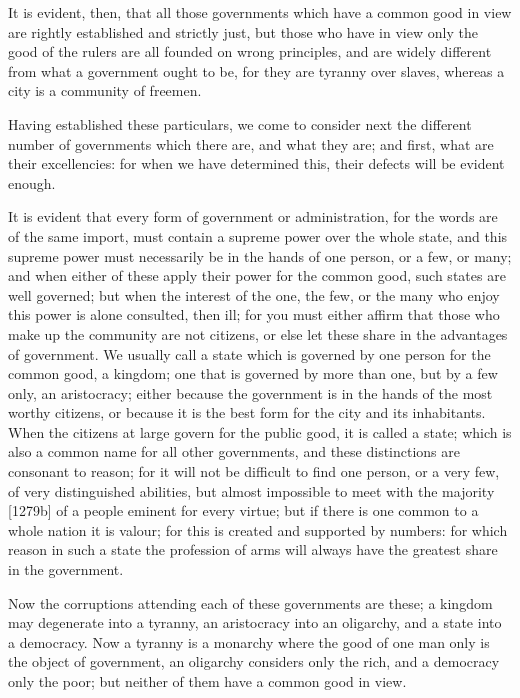 It is evident, then, that all those governments which have a common good
in view are rightly established and strictly just, but those who have in
view only the good of the rulers are all founded on wrong principles, and
are widely different from what a government ought to be, for they are
tyranny over slaves, whereas a city is a community of freemen.


Having established these particulars, we come to consider next the
different number of governments which there are, and what they are; and
first, what are their excellencies: for when we have determined this,
their defects will be evident enough.

It is evident that every form of government or administration, for the
words are of the same import, must contain a supreme power over the whole
state, and this supreme power must necessarily be in the hands of one
person, or a few, or many; and when either of these apply their power for
the common good, such states are well governed; but when the interest of
the one, the few, or the many who enjoy this power is alone consulted,
then ill; for you must either affirm that those who make up the community
are not citizens, or else let these share in the advantages of government.
We usually call a state which is governed by one person for the common
good, a kingdom; one that is governed by more than one, but by a few only,
an aristocracy; either because the government is in the hands of the most
worthy citizens, or because it is the best form for the city and its
inhabitants. When the citizens at large govern for the public good, it is
called a state; which is also a common name for all other governments, and
these distinctions are consonant to reason; for it will not be difficult
to find one person, or a very few, of very distinguished abilities, but
almost impossible to meet with the majority [1279b] of a people eminent
for every virtue; but if there is one common to a whole nation it is
valour; for this is created and supported by numbers: for which reason in
such a state the profession of arms will always have the greatest share in
the government.

Now the corruptions attending each of these governments are these; a
kingdom may degenerate into a tyranny, an aristocracy into an oligarchy,
and a state into a democracy. Now a tyranny is a monarchy where the good
of one man only is the object of government, an oligarchy considers only
the rich, and a democracy only the poor; but neither of them have a common
good in view.

